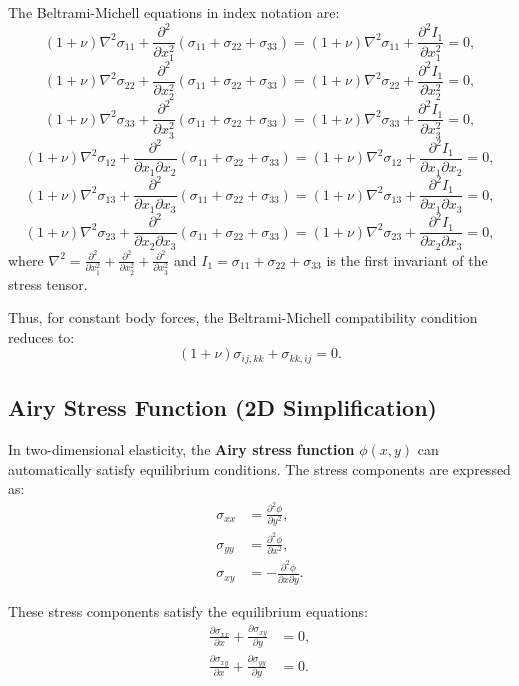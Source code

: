 \documentclass[fleqn,10pt]{olplainarticle}
\begin{document}
The Beltrami-Michell equations in index notation are:
\[
(1 + \nu) \nabla^2 \sigma_{11} + \frac{\partial^2}{\partial x_1^2} (\sigma_{11} + \sigma_{22} + \sigma_{33}) = (1 + \nu) \nabla^2 \sigma_{11} + \frac{\partial^2 I_1}{\partial x_1^2} = 0,
\]
\[
(1 + \nu) \nabla^2 \sigma_{22} + \frac{\partial^2}{\partial x_2^2} (\sigma_{11} + \sigma_{22} + \sigma_{33}) = (1 + \nu) \nabla^2 \sigma_{22} + \frac{\partial^2 I_1}{\partial x_2^2} = 0,
\]
\[
(1 + \nu) \nabla^2 \sigma_{33} + \frac{\partial^2}{\partial x_3^2} (\sigma_{11} + \sigma_{22} + \sigma_{33}) = (1 + \nu) \nabla^2 \sigma_{33} + \frac{\partial^2 I_1}{\partial x_3^2} = 0,
\]
\[
(1 + \nu) \nabla^2 \sigma_{12} + \frac{\partial^2}{\partial x_1 \partial x_2} (\sigma_{11} + \sigma_{22} + \sigma_{33}) = (1 + \nu) \nabla^2 \sigma_{12} + \frac{\partial^2 I_1}{\partial x_1 \partial x_2} = 0,
\]
\[
(1 + \nu) \nabla^2 \sigma_{13} + \frac{\partial^2}{\partial x_1 \partial x_3} (\sigma_{11} + \sigma_{22} + \sigma_{33}) = (1 + \nu) \nabla^2 \sigma_{13} + \frac{\partial^2 I_1}{\partial x_1 \partial x_3} = 0,
\]
\[
(1 + \nu) \nabla^2 \sigma_{23} + \frac{\partial^2}{\partial x_2 \partial x_3} (\sigma_{11} + \sigma_{22} + \sigma_{33}) = (1 + \nu) \nabla^2 \sigma_{23} + \frac{\partial^2 I_1}{\partial x_2 \partial x_3} = 0,
\]
where \( \nabla^2 = \frac{\partial^2}{\partial x_1^2} + \frac{\partial^2}{\partial x_2^2} + \frac{\partial^2}{\partial x_3^2} \) and \( I_1 = \sigma_{11} + \sigma_{22} + \sigma_{33} \) is the first invariant of the stress tensor.

Thus, for constant body forces, the Beltrami-Michell compatibility condition reduces to:
\[
(1 + \nu) \sigma_{ij,kk} + \sigma_{kk,ij} = 0.
\]


\subsection{Airy Stress Function (2D Simplification)}
In two-dimensional elasticity, the \textbf{Airy stress function} \(\phi(x, y)\) can automatically satisfy equilibrium conditions. The stress components are expressed as:
\begin{align}
\sigma_{xx} &= \frac{\partial^2 \phi}{\partial y^2}, \\
\sigma_{yy} &= \frac{\partial^2 \phi}{\partial x^2}, \\
\sigma_{xy} &= -\frac{\partial^2 \phi}{\partial x \partial y}.
\end{align}

These stress components satisfy the equilibrium equations:
\begin{align}
\frac{\partial \sigma_{xx}}{\partial x} + \frac{\partial \sigma_{xy}}{\partial y} &= 0, \\
\frac{\partial \sigma_{xy}}{\partial x} + \frac{\partial \sigma_{yy}}{\partial y} &= 0.
\end{align}
\end{document}
